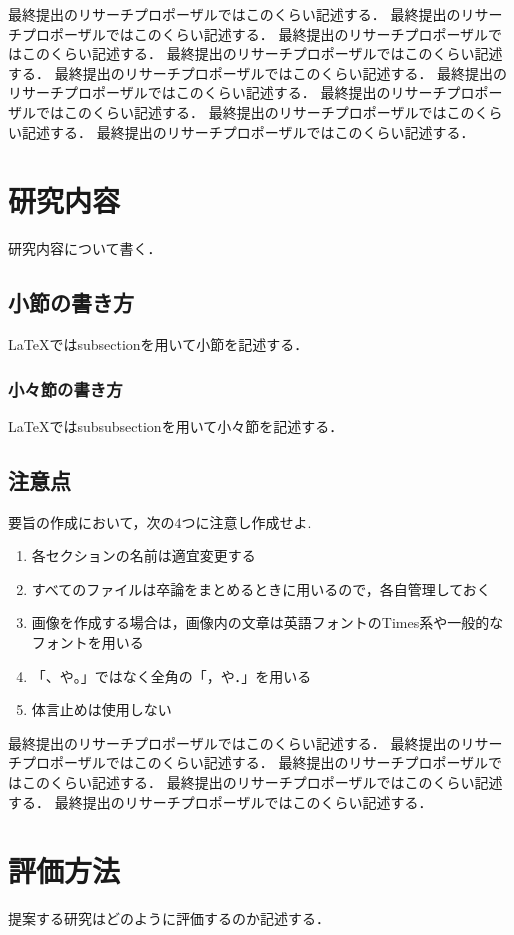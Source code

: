\documentclass[twocolumn,article]{jlreq}
\begin{document}
最終提出のリサーチプロポーザルではこのくらい記述する．
最終提出のリサーチプロポーザルではこのくらい記述する．
最終提出のリサーチプロポーザルではこのくらい記述する．
最終提出のリサーチプロポーザルではこのくらい記述する．
最終提出のリサーチプロポーザルではこのくらい記述する．
最終提出のリサーチプロポーザルではこのくらい記述する．
最終提出のリサーチプロポーザルではこのくらい記述する．
最終提出のリサーチプロポーザルではこのくらい記述する．
最終提出のリサーチプロポーザルではこのくらい記述する．


\section{研究内容}%
研究内容について書く．

\subsection{小節の書き方}
\LaTeX ではsubsectionを用いて小節を記述する．

\subsubsection{小々節の書き方}
\LaTeX ではsubsubsectionを用いて小々節を記述する．

\subsection{注意点}
要旨の作成において，次の$4$つに注意し作成せよ.
\begin{enumerate}
  \item 各セクションの名前は適宜変更する
  \item すべてのファイルは卒論をまとめるときに用いるので，各自管理しておく
  \item 画像を作成する場合は，画像内の文章は英語フォントのTimes系や一般的なフォントを用いる
  \item 「、や。」ではなく全角の「，や．」を用いる
  \item 体言止めは使用しない
\end{enumerate}


最終提出のリサーチプロポーザルではこのくらい記述する．
最終提出のリサーチプロポーザルではこのくらい記述する．
最終提出のリサーチプロポーザルではこのくらい記述する．
最終提出のリサーチプロポーザルではこのくらい記述する．
最終提出のリサーチプロポーザルではこのくらい記述する．




\section{評価方法}
提案する研究はどのように評価するのか記述する．
\end{document}
